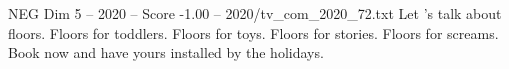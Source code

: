 \begin{textsample}{NEG Dim 5 – 2020 – Score -1.00 – 2020/tv\_com\_2020\_72.txt}  \label{ex:f5_neg_067}
Let 's talk about floors.
Floors for toddlers.
Floors for toys.
Floors for stories.
Floors for screams.
Book now and have yours installed by the holidays.

\end{textsample}
